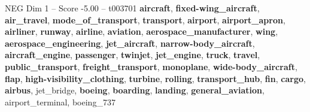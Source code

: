 \begin{textsample}{NEG Dim 1 – Score -5.00 – t003701}  \label{ex:f1_neg_011}
\textbf{aircraft}, \textbf{fixed-wing\_aircraft}, \textbf{air\_travel}, \textbf{mode\_of\_transport}, \textbf{transport}, \textbf{airport}, \textbf{airport\_apron}, \textbf{airliner}, \textbf{runway}, \textbf{airline}, \textbf{aviation}, \textbf{aerospace\_manufacturer}, \textbf{wing}, \textbf{aerospace\_engineering}, \textbf{jet\_aircraft}, \textbf{narrow-body\_aircraft}, \textbf{aircraft\_engine}, \textbf{passenger}, \textbf{twinjet}, \textbf{jet\_engine}, \textbf{truck}, \textbf{travel}, \textbf{public\_transport}, \textbf{freight\_transport}, \textbf{monoplane}, \textbf{wide-body\_aircraft}, \textbf{flap}, \textbf{high-visibility\_clothing}, \textbf{turbine}, \textbf{rolling}, \textbf{transport\_hub}, \textbf{fin}, \textbf{cargo}, \textbf{airbus}, jet\_bridge, \textbf{boeing}, \textbf{boarding}, \textbf{landing}, \textbf{general\_aviation}, airport\_terminal, boeing\_737

\end{textsample}

